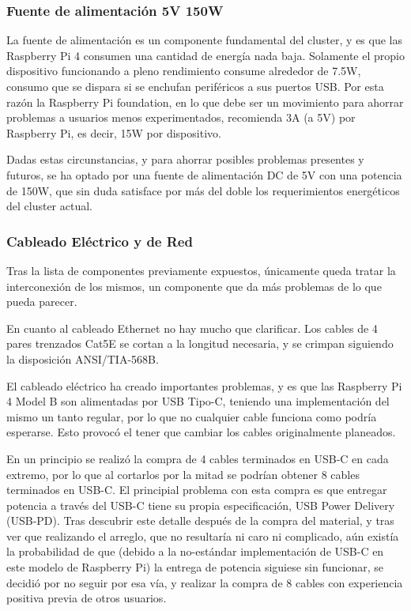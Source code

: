 
\subsubsection{Fuente de alimentación 5V 150W}
La fuente de alimentación es un componente fundamental del cluster, y es que las Raspberry Pi 4 consumen una cantidad de energía nada baja. Solamente el propio dispositivo funcionando a pleno rendimiento consume alrededor de 7.5W, consumo que se dispara si se enchufan periféricos a sus puertos USB. Por esta razón la Raspberry Pi foundation, en lo que debe ser un movimiento para ahorrar problemas a usuarios menos experimentados, recomienda 3A (a 5V) por Raspberry Pi, es decir, 15W por dispositivo.\cite{raspberrypi_power-requirements}

Dadas estas circunstancias, y para ahorrar posibles problemas presentes y futuros, se ha optado por una fuente de alimentación DC de 5V con una potencia de 150W, que sin duda satisface por más del doble los requerimientos energéticos del cluster actual.


\subsubsection{Cableado Eléctrico y de Red}
\label{sssec:cableado_electrico_red}
Tras la lista de componentes previamente expuestos, únicamente queda tratar la interconexión de los mismos, un componente que da más problemas de lo que pueda parecer.

En cuanto al cableado Ethernet no hay mucho que clarificar. Los cables de 4 pares trenzados Cat5E se cortan a la longitud necesaria, y se crimpan siguiendo la disposición ANSI/TIA-568B.

El cableado eléctrico ha creado importantes problemas, y es que las Raspberry Pi 4 Model B son alimentadas por USB Tipo-C, teniendo una implementación del mismo un tanto regular, por lo que no cualquier cable funciona como podría esperarse. Esto provocó el tener que cambiar los cables originalmente planeados.

En un principio se realizó la compra de 4 cables terminados en USB-C en cada extremo, por lo que al cortarlos por la mitad se podrían obtener 8 cables terminados en USB-C. El principial problema con esta compra es que entregar potencia a través del USB-C tiene su propia especificación, USB Power Delivery (USB-PD). Tras descubrir este detalle después de la compra del material, y tras ver que realizando el arreglo, que no resultaría ni caro ni complicado, aún existía la probabilidad de que (debido a la no-estándar implementación de USB-C en este modelo de Raspberry Pi) la entrega de potencia siguiese sin funcionar, se decidió por no seguir por esa vía, y realizar la compra de 8 cables con experiencia positiva previa de otros usuarios. 

